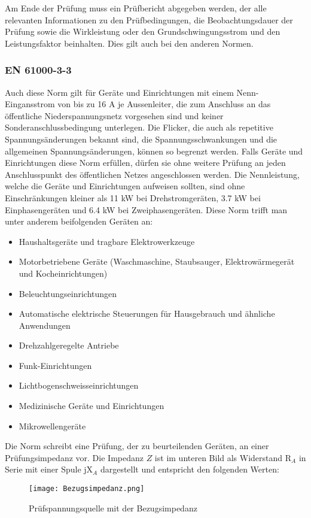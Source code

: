 Am Ende der Prüfung muss ein Prüfbericht abgegeben werden, der alle relevanten Informationen zu den Prüfbedingungen, die Beobachtungsdauer der Prüfung sowie die Wirkleistung oder den Grundschwingungsstrom und den Leistungsfaktor beinhalten. Dies gilt auch bei den anderen Normen.

\subsubsection{EN 61000-3-3}
Auch diese Norm gilt für Geräte und Einrichtungen mit einem Nenn-Eingansstrom von bis zu 16 A je Aussenleiter, die zum Anschluss an das öffentliche Niederspannungsnetz vorgesehen sind und keiner Sonderanschlussbedingung unterlegen. Die Flicker, die auch als repetitive Spannungsänderungen bekannt sind, die Spannungsschwankungen und die allgemeinen Spannungsänderungen, können so begrenzt werden. Falls Geräte und Einrichtungen diese Norm erfüllen, dürfen sie ohne weitere Prüfung an jeden Anschlusspunkt des öffentlichen Netzes angeschlossen werden. Die Nennleistung, welche die Geräte und Einrichtungen aufweisen sollten, sind ohne Einschränkungen kleiner als 11 kW bei Drehstromgeräten, 3.7 kW bei Einphasengeräten und 6.4 kW bei Zweiphasengeräten. Diese Norm trifft man unter anderem beifolgenden Geräten an:
\begin{itemize}
\item Haushaltsgeräte und tragbare Elektrowerkzeuge 
\item Motorbetriebene Geräte (Waschmaschine, Staubsauger, Elektrowärmegerät und Kocheinrichtungen)
\item Beleuchtungseinrichtungen
\item Automatische elektrische Steuerungen für Hausgebrauch und ähnliche Anwendungen
\item Drehzahlgeregelte Antriebe
\item Funk-Einrichtungen
\item Lichtbogenschweisseinrichtungen
\item Medizinische Geräte und Einrichtungen
\item Mikrowellengeräte	
\end{itemize}

Die Norm schreibt eine Prüfung, der zu beurteilenden Geräten, an einer Prüfungsimpedanz vor. Die Impedanz $Z$ ist im unteren Bild als Widerstand R$_A$ in Serie mit einer Spule jX$_A$ dargestellt und entspricht den folgenden Werten:


\begin{figure}[ht!]
	\centering
	\texttt{[image: Bezugsimpedanz.png]}	
	\caption{Prüfspannungsquelle mit der Bezugsimpedanz}
	\label{fig:Bezugsimpedanz}
\end{figure}

